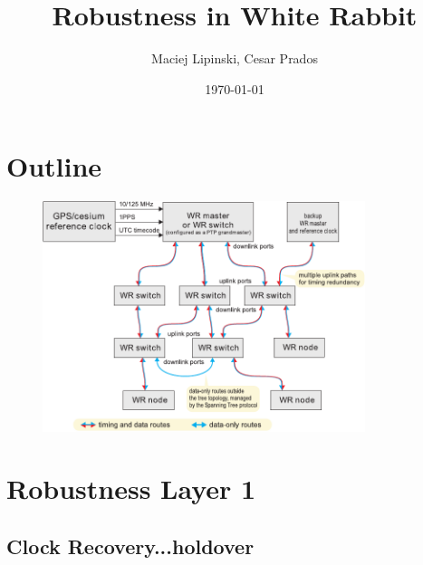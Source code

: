 \documentclass[]{beamer}
\title{Robustness in White Rabbit}    %
\author{Maciej Lipinski, Cesar Prados}                 %
\institute{CERN \&  GSI}      %
\date{\today}                    %
\begin{document}
\begin{frame}
\end{frame}

\section*{Outline}
\begin{frame}
  \tableofcontents
\end{frame}

\begin{frame}
\begin{figure}[tbp] %
  \centering
  \includegraphics[height=2.65in,keepaspectratio]{../../figures/network/hierarchy.pdf}
  \label{fig:hierarchy}
\end{figure}

\end{frame}

\section{Robustness Layer 1}

\subsection{Clock Recovery...holdover}
\end{document}
